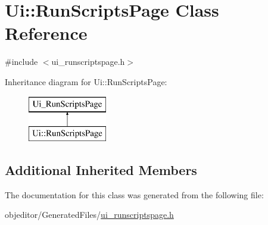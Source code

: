 \hypertarget{class_ui_1_1_run_scripts_page}{}\section{Ui\+::Run\+Scripts\+Page Class Reference}
\label{class_ui_1_1_run_scripts_page}


{\ttfamily \#include $<$ui\+\_\+runscriptspage.\+h$>$}

Inheritance diagram for Ui\+::Run\+Scripts\+Page\+:\begin{figure}[H]
\begin{center}
\leavevmode
\includegraphics[height=2.000000cm]{d4/db3/class_ui_1_1_run_scripts_page}
\end{center}
\end{figure}
\subsection*{Additional Inherited Members}


The documentation for this class was generated from the following file\+:\begin{DoxyCompactItemize}
\item 
objeditor/\+Generated\+Files/\mbox{\hyperlink{ui__runscriptspage_8h}{ui\+\_\+runscriptspage.\+h}}\end{DoxyCompactItemize}
